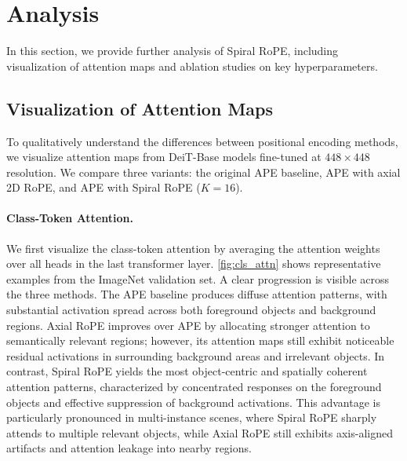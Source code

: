 
\section{Analysis}
\label{sec:analysis}

In this section, we provide further analysis of Spiral RoPE, including visualization of attention maps and ablation studies on key hyperparameters.

\subsection{Visualization of Attention Maps}

To qualitatively understand the differences between positional encoding methods, we visualize attention maps from DeiT-Base models fine-tuned at $448 \times 448$ resolution. We compare three variants: the original APE baseline, APE with axial 2D RoPE, and APE with Spiral RoPE ($K=16$).

\paragraph{Class-Token Attention.} We first visualize the class-token attention by averaging the attention weights over all heads in the last transformer layer. \cref{fig:cls_attn} shows representative examples from the ImageNet validation set. A clear progression is visible across the three methods. The APE baseline produces diffuse attention patterns, with substantial activation spread across both foreground objects and background regions. Axial RoPE improves over APE by allocating stronger attention to semantically relevant regions; however, its attention maps still exhibit noticeable residual activations in surrounding background areas and irrelevant objects. 
In contrast, Spiral RoPE yields the most object-centric and spatially coherent attention patterns, characterized by concentrated responses on the foreground objects and effective suppression of background activations. 
This advantage is particularly pronounced in multi-instance scenes, where Spiral RoPE sharply attends to multiple relevant objects, while Axial RoPE still exhibits axis-aligned artifacts and attention leakage into nearby regions.


